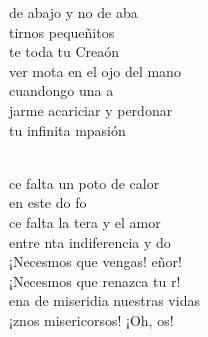 \documentclass[12pt]{article}
\begin{document}
\begin{multicols*}{2}
\begin{cancion}
	de abajo y no de aba\\
	tirnos pequeñitos \\
	te toda tu Creaón\\
	 ver mota en el ojo del mano \\
	cuandongo una a\\
	jarme acariciar y perdonar\\
	 tu infinita mpasión\\\jump\\
	\begin{chorus}%
	ce falta un poto de calor \\
	en este do fo\\
	ce falta la tera y el amor \\
	entre nta indiferencia y do\\
	¡Necesmos que vengas! eñor!\\
	¡Necesmos que renazca tu r!\\
	ena de miseridia nuestras vidas\\
	¡znos misericorsos! ¡Oh, os! \\
	\end{chorus}%
	\jump\\
\end{cancion}%


\end{multicols*}
\end{document}

